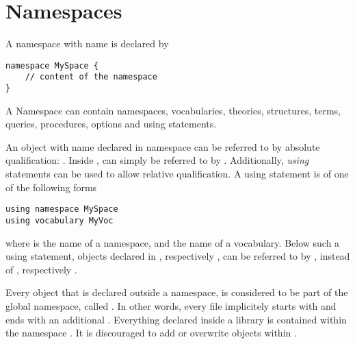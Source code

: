 \section{Namespaces}
A namespace with name  is declared by
\begin{lstlisting}
namespace MySpace {
	// content of the namespace
}
\end{lstlisting}

A Namespace can contain namespaces, vocabularies, theories, structures, terms, queries, procedures, options and using statements.  

An object with name  declared in namespace  can be referred to by absolute qualification: .  
Inside ,  can simply be referred to by .
Additionally, \emph{using} statements can be used to allow relative qualification.
A using statement is of one of the following forms
\begin{lstlisting}
using namespace MySpace
using vocabulary MyVoc
\end{lstlisting}
where  is the name of a namespace, and  the name of a vocabulary.  Below such a using statement, objects  declared in , respectively , can be referred to by , instead of , respectively .

Every object that is declared outside a namespace, is considered to be part of the global namespace, called \code{\globalspace}.  
In other words, every \idp file implicitely starts with  and ends with an additional \code{\}}.
Everything declared inside a library is contained within the namespace \code{\stdspace}. 
It is discouraged to add or overwrite objects within \stdspace. 

